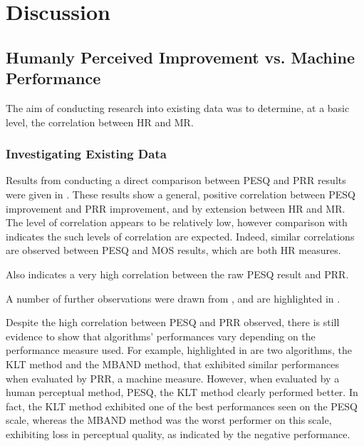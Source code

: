 
\chapter{Discussion}

\acresetall


\section{Humanly Perceived Improvement vs. Machine Performance}

The aim of conducting research into existing data was to determine,
at a basic level, the correlation between \ac{HR} and \ac{MR}.


\subsection{Investigating Existing Data}

Results from conducting a direct comparison between \ac{PESQ} and
\ac{PRR} results were given in . These results
show a general, positive correlation between \ac{PESQ} improvement
and \ac{PRR} improvement, and by extension between \ac{HR} and \ac{MR}.
The level of correlation appears to be relatively low, however comparison
with  indicates the such levels of correlation
are expected. Indeed, similar correlations are observed between \ac{PESQ}
and \ac{MOS} results, which are both \ac{HR} measures.

 Also indicates a very high correlation between
the raw \ac{PESQ} result and \ac{PRR}.

A number of further observations were drawn from ,
and are highlighted in .

Despite the high correlation between \ac{PESQ} and \ac{PRR} observed,
there is still evidence to show that algorithms' performances vary
depending on the performance measure used. For example, highlighted
in  are two algorithms, the \ac{KLT} method
and the \ac{MBAND} method, that exhibited similar performances when
evaluated by \ac{PRR}, a machine measure. However, when evaluated
by a human perceptual method, \ac{PESQ}, the \ac{KLT} method clearly
performed better. In fact, the \ac{KLT} method exhibited one of the
best performances seen on the \ac{PESQ} scale, whereas the \ac{MBAND}
method was the worst performer on this scale, exhibiting loss in perceptual
quality, as indicated by the negative performance.

